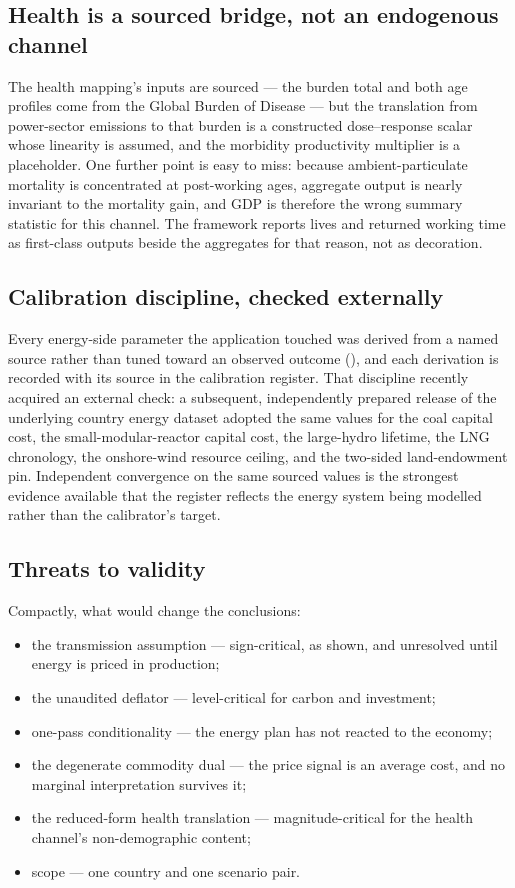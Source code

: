 \subsection{Health is a sourced bridge, not an endogenous channel}
The health mapping's inputs are sourced --- the burden total and both age profiles come
from the Global Burden of Disease --- but the translation from power-sector emissions
to that burden is a constructed dose--response scalar whose linearity is assumed, and
the morbidity productivity multiplier is a placeholder. One further point is easy to
miss: because ambient-particulate mortality is concentrated at post-working ages,
aggregate output is nearly invariant to the mortality gain, and GDP is therefore the
wrong summary statistic for this channel. The framework reports lives and returned
working time as first-class outputs beside the aggregates for that reason, not as
decoration.

\subsection{Calibration discipline, checked externally}
Every energy-side parameter the application touched was derived from a named source
rather than tuned toward an observed outcome (), and each
derivation is recorded with its source in the calibration register. That discipline
recently acquired an external check: a subsequent, independently prepared release of
the underlying country energy dataset adopted the same values for the coal capital
cost, the small-modular-reactor capital cost, the large-hydro lifetime, the LNG
chronology, the onshore-wind resource ceiling, and the two-sided land-endowment pin.
Independent convergence on the same sourced values is the strongest evidence available
that the register reflects the energy system being modelled rather than the
calibrator's target.

\subsection{Threats to validity}
Compactly, what would change the conclusions:
\begin{itemize}
\item the transmission assumption --- sign-critical, as shown, and unresolved until
  energy is priced in production;
\item the unaudited deflator --- level-critical for carbon and investment;
\item one-pass conditionality --- the energy plan has not reacted to the economy;
\item the degenerate commodity dual --- the price signal is an average cost, and no
  marginal interpretation survives it;
\item the reduced-form health translation --- magnitude-critical for the health
  channel's non-demographic content;
\item scope --- one country and one scenario pair.
\end{itemize}
